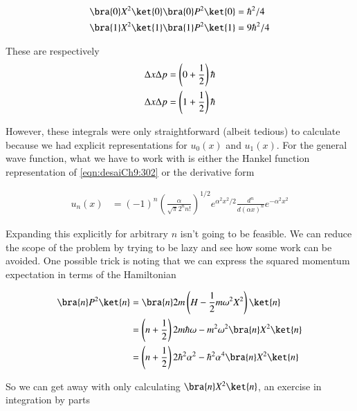 \begin{align}\label{eqn:desaiCh9:303}
\bra{0} X^2 \ket{0} \bra{0} P^2 \ket{0} &= \hbar^2/4  \\
\bra{1} X^2 \ket{1} \bra{1} P^2 \ket{1} &= 9 \hbar^2/4
\end{align}

These are respectively
\begin{align}\label{eqn:desaiCh9:304}
\Delta x \Delta p &= \left( 0 + \frac{1}{2} \right) \hbar \\
\Delta x \Delta p &= \left( 1 + \frac{1}{2} \right) \hbar
\end{align}

However, these integrals were only straightforward (albeit tedious) to calculate because we had explicit representations for $u_0(x)$ and $u_1(x)$.  For the general wave function, what we have to work with is either the Hankel function representation of \ref{eqn:desaiCh9:302} or the derivative form

\begin{align}\label{eqn:desaiCh9:302b}
u_n(x) &= (-1)^n
\left( \frac{ \alpha}{\sqrt{\pi} 2^n n!} \right)^{1/2} 
e^{ \alpha^2 x^2/2}
\frac{d^n}{d (\alpha x)^n}
e^{ -\alpha^2 x^2}
\end{align}

Expanding this explicitly for arbitrary $n$ isn't going to be feasible.  We can reduce the scope of the problem by trying to be lazy and see how some work can be avoided.  One possible trick is noting that we can express the squared momentum expectation in terms of the Hamiltonian

\begin{align*}
\bra{n} P^2 \ket{n}
&=
\bra{n} 2m \left( H - \inv{2} m \omega^2 X^2 \right) \ket{n} \\
&=
\left( n + \inv{2} \right) 2 m \hbar \omega
- m^2 \omega^2 \bra{n} X^2 \ket{n} \\
&=
\left( n + \inv{2} \right) 2 \hbar^2 \alpha^2 
- \hbar^2 \alpha^4 \bra{n} X^2 \ket{n} \\
\end{align*}

So we can get away with only calculating $\bra{n} X^2 \ket{n}$, an exercise in integration by parts

